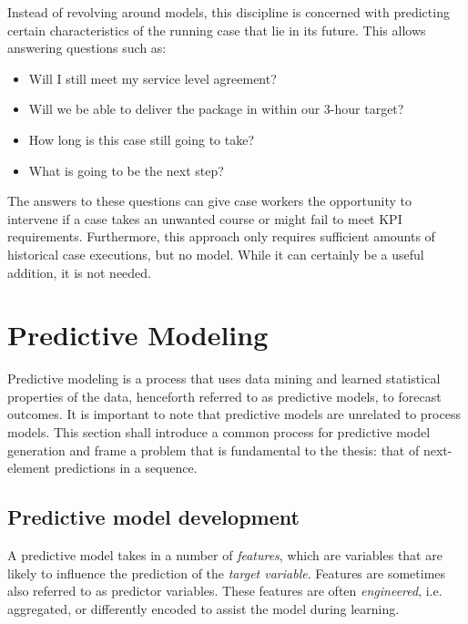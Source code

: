 Instead of revolving around models, this discipline is concerned with predicting certain characteristics of the running case that lie in its future. This allows answering questions such as:

\begin{itemize}
    \item Will I still meet my service level agreement?
    \item Will we be able to deliver the package in within our 3-hour target?
    \item How long is this case still going to take?
    \item What is going to be the next step?
\end{itemize}

The answers to these questions can give case workers the opportunity to intervene if a case takes an unwanted course or might fail to meet KPI requirements. Furthermore, this approach only requires sufficient amounts of historical case executions, but no model. While it can certainly be a useful addition, it is not needed. 


\section{Predictive Modeling}
Predictive modeling is a process that uses data mining and learned statistical properties of the data, henceforth referred to as predictive models, to forecast outcomes. It is important to note that predictive models are unrelated to process models. This section shall introduce a common process for predictive model generation and frame a problem that is fundamental to the thesis: that of next-element predictions in a sequence.

\subsection{Predictive model development}
A predictive model takes in a number of \textit{features}, which are variables that are likely to influence the prediction of the \textit{target variable}. Features are sometimes also referred to as predictor variables.
These features are often \textit{engineered}, i.e. aggregated, or differently encoded to assist the model during learning.

